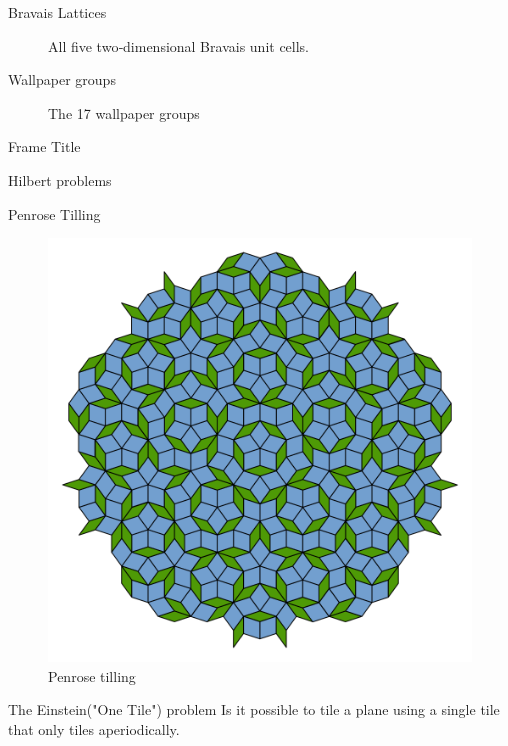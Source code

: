 \documentclass{beamer}
\theoremstyle{definition}
\begin{document}
\begin{frame}{Bravais Lattices}
    \begin{figure}
        \centering
        
        \caption{All five two‐dimensional Bravais unit cells.}
        \label{fig:bravis-lattices}
    \end{figure}
\end{frame}



\begin{frame}{Wallpaper groups}
    \begin{figure}
        \centering
        
        \caption{The 17 wallpaper groups }
        \label{fig:17WallpaperGroups}
    \end{figure}
\end{frame}

\begin{frame}{Frame Title}
    
\end{frame}


\begin{frame}{Hilbert problems}
    
\end{frame}

\begin{frame}{Penrose Tilling}
    \begin{figure}
        \centering
        \includegraphics[width=0.5\linewidth]{Pictures/Penrose_Tiling_(Rhombi).svg}
        \caption{Penrose tilling}
        \label{fig:penrose-rhombi}
    \end{figure}
\end{frame}

\begin{frame}{The Einstein("One Tile") problem}
    Is it possible to tile a plane using a single tile that only tiles aperiodically.
\end{frame}
\end{document}
